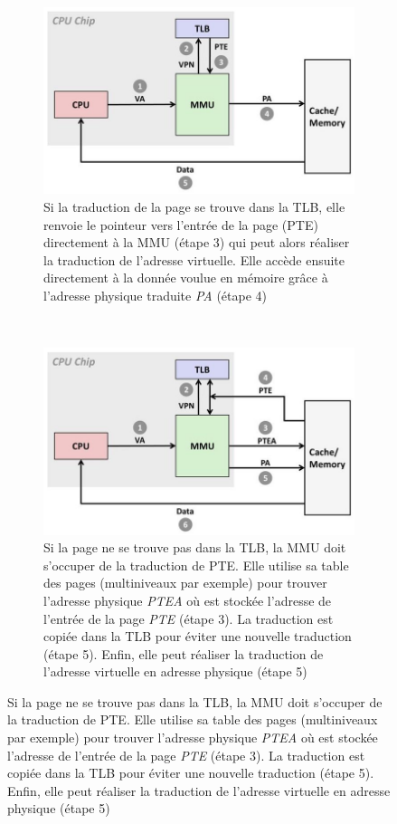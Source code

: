\begin{figure}
    \begin{subfigure}[t]{0.48\linewidth}\centering
        \includegraphics[width=\linewidth]{images/memory_page_table_tlb_hit.jpg}
        \caption{Si la traduction de la page se trouve dans la TLB, elle renvoie le pointeur vers l'entrée de la page (PTE) directement à la MMU (étape 3) qui peut alors réaliser la traduction de l'adresse virtuelle. Elle accède ensuite directement à la donnée voulue en mémoire grâce à l'adresse physique traduite \textit{PA} (étape 4)}
        \label{pic_memory_page_table_tlb_hit}
    \end{subfigure}
    ~ %
    \begin{subfigure}[t]{0.48\linewidth}\centering
        \includegraphics[width=\linewidth]{images/memory_page_table_tlb_miss.jpg}
        \caption{Si la page ne se trouve pas dans la TLB, la MMU doit s'occuper de la traduction  de PTE. Elle utilise sa table des pages (multiniveaux par exemple) pour trouver l'adresse physique \textit{PTEA} où est stockée l'adresse de l'entrée de la page \textit{PTE} (étape 3). La traduction est copiée dans la TLB pour éviter une nouvelle traduction (étape 5). Enfin, elle peut réaliser la traduction de l'adresse virtuelle en adresse physique (étape 5)}

\end{subfigure}
\end{figure}
